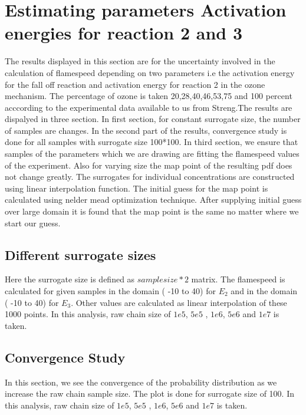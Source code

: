 \section{Estimating parameters Activation energies for reaction 2  and 3  }

The results displayed in this section are for the uncertainty involved in the calculation of flamespeed depending on two parameters i.e the activation energy for the fall off reaction and activation energy for reaction 2 in the ozone mechanism. The percentage of ozone is taken  20,28,40,46,53,75 and 100  percent acccording to the experimental data available to us from Streng\cite{Streng}.The results are dispalyed in three section. In first section, for constant surrogate size, the number of samples are changes. In the second part of the results, convergence study is done for all samples with surrogate size 100*100. In third section, we ensure that samples of the parameters which we are drawing are fitting the flamespeed values of the experiment. Also for varying size the map point of the resulting pdf does not change greatly. The surrogates for individual concentrations are constructed using linear interpolation function. The initial guess for the map point is calculated using nelder mead optimization technique. After supplying initial guess over large domain it is found that the map point is the same no matter where we start our guess. 
\bigskip

\subsection{Different surrogate sizes }

\noindent Here the surrogate size is defined as $sample size*2$ matrix. The flamespeed is calculated for given samples in the domain ( -10 to 40) for $E_2$ and in the domain ( -10 to 40) for $E_3$. Other values are calculated as linear interpolation of these 1000 points. In this analysis, raw chain size of $1e5$, $5e5$ , $1e6$, $5e6$ and $1e7$ is taken. 







\subsection{Convergence Study }

\noindent In this section, we see the convergence of the probability distribution as we increase the raw chain sample size. The plot is done for surrogate size of 100. In this analysis, raw chain size of $1e5$, $5e5$ , $1e6$, $5e6$ and $1e7$ is taken. 


